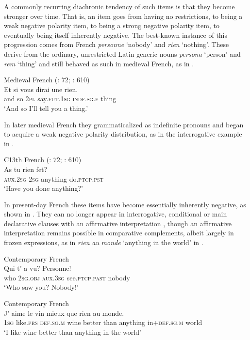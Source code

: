 \documentclass[output=paper]{langsci/langscibook}
\begin{document}
A commonly recurring diachronic tendency of such items is that they become stronger over time. That is, an item goes from having no restrictions, to being a weak negative polarity item, to being a strong negative polarity item, to eventually being itself inherently negative. The best-known instance of this progression comes from French \textit{personne} ‘nobody’ and \textit{rien} ‘nothing’. These derive from the ordinary, unrestricted Latin generic nouns \textit{persona} ‘person’ and \textit{rem} ‘thing’ and still behaved as such in medieval French, as in .


\ea\label{ex:key:med}
{       Medieval French (\citealt{Hansen2013}: 72; \citealt{Buridant2000}: 610)} \\
\gll Et si vous dirai une rien.\\
     and so \textsc{2pl} say.\textsc{fut.1sg} \textsc{indf.sg.f} thing\\
\glt ‘And so I’ll tell you a thing.’
\z

In later medieval French they grammaticalized as indefinite pronouns and began to acquire a weak negative polarity distribution, as in the interrogative example in .

\ea\label{ex:key:c13}
{       C13th French (\citealt{Hansen2013}: 72; \citealt{Buridant2000}: 610)} \\
\gll As tu rien fet?\\
     \textsc{aux.2sg} \textsc{2sg} anything do.\textsc{ptcp.pst}\\
\glt ‘Have you done anything?’
\z

In present-day French these items have become essentially inherently negative, as shown in . They can no longer appear in interrogative, conditional or main declarative clauses with an affirmative interpretation \citep[73]{Hansen2013}, though an affirmative interpretation remains possible in comparative complements, albeit largely in frozen expressions, as in \textit{rien} \textit{au} \textit{monde} ‘anything in the world’ in .

\ea\label{ex:key:cont}
{       Contemporary French \citep[68]{Hansen2013}} \\
\gll Qui t’ a vu? Personne!\\
     who 2\textsc{sg.obj} \textsc{aux.3sg} see.\textsc{ptcp.past} nobody\\
\glt ‘Who saw you? Nobody!’
\z

\ea\label{ex:key:cont1}
{       Contemporary French \citep[73]{Hansen2013}} \\
\gll J’ aime le vin mieux que rien au monde.\\
     \textsc{1sg} like.\textsc{prs} \textsc{def.sg.m} wine better than anything in+\textsc{def.sg.m} world\\
\glt ‘I like wine better than anything in the world’
\z
\end{document}
